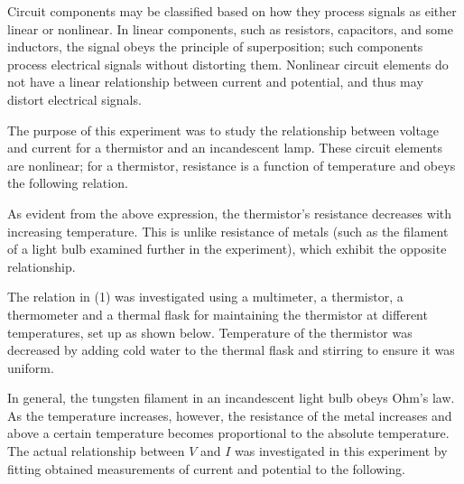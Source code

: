 \begin{paper}
	

	Circuit components may be classified based on how they process signals as either linear or nonlinear. In linear components, such as resistors, capacitors, and some inductors, the signal obeys the principle of superposition; such components process electrical signals without distorting them. Nonlinear circuit elements do not have a linear relationship between current and potential, and thus may distort electrical signals. 
	
	The purpose of this experiment was to study the relationship between voltage and current for a thermistor and an incandescent lamp. These circuit elements are nonlinear; for a thermistor, resistance is a function of temperature and obeys the following relation.
	
	\begin{paperwhere}
	\end{paperwhere}

	As evident from the above expression, the thermistor's resistance decreases with increasing temperature. This is unlike resistance of metals (such as the filament of a light bulb examined further in the experiment), which exhibit the opposite relationship.

	The relation in (1) was investigated using a multimeter, a thermistor, a thermometer and a thermal flask for maintaining the thermistor at different temperatures, set up as shown below. Temperature of the thermistor was decreased by adding cold water to the thermal flask and stirring to ensure it was uniform. \vspace{-0.8em}
	
	
	In general, the tungsten filament in an incandescent light bulb obeys Ohm's law. As the temperature increases, however, the resistance of the metal increases and above a certain temperature becomes proportional to the absolute temperature. The actual relationship between \( V \) and \( I \) was investigated in this experiment by fitting obtained measurements of current and potential to the following.
	

\end{paper}
